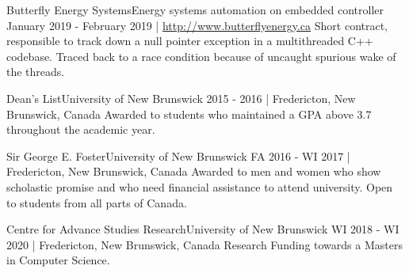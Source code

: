 \documentclass[english,letterpaper,12pt]{deedy-resume-openfont}
\begin{document}
    \employement%
        {Butterfly Energy Systems}{Energy systems automation on embedded controller}
        {January 2019 - February 2019 | \href{http://www.butterflyenergy.ca/home.php}{http://www.butterflyenergy.ca}}{%
        Short contract, responsible to track down a null pointer exception in a multithreaded C++ codebase.
        Traced back to a race condition because of uncaught spurious wake of the threads.
        }


    \employement%
        {Dean's List}{University of New Brunswick}
        {2015 - 2016 | Fredericton, New Brunswick, Canada}{%
        Awarded to students who maintained a GPA above 3.7 throughout the academic year.
        }


    \employement%
        {Sir George E. Foster}{University of New Brunswick}
        {FA 2016 - WI 2017  | Fredericton, New Brunswick, Canada}{%
        Awarded to men and women who show scholastic promise and who need financial assistance to attend university. 
        Open to students from all parts of Canada.
        }

    \employement%
        {Centre for Advance Studies Research}{University of New Brunswick}
        {WI 2018 - WI 2020   | Fredericton, New Brunswick, Canada}{%
        Research Funding towards a Masters in Computer Science.
        }











\end{document}
